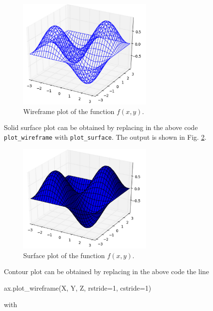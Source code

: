 \begin{figure}[!ht]
\begin{center}
\includegraphics[width=0.6\textwidth]{imgp/plot3d-2.png}
\end{center}
\vspace{-4mm}
\caption{Wireframe plot of the function $f(x, y)$.}
\label{fig:plot3d-2}
\end{figure}
\noindent
Solid surface plot can be obtained by replacing in the above code 
{\tt plot\_wireframe} with {\tt plot\_surface}. 
The output is shown in Fig. \ref{fig:plot3d-3}.

\begin{figure}[!ht]
\begin{center}
\includegraphics[width=0.6\textwidth]{imgp/plot3d-3.png}
\end{center}
\vspace{-4mm}
\caption{Surface plot of the function $f(x, y)$.}
\label{fig:plot3d-3}
\end{figure}
\newpage

\noindent
Contour plot can be obtained by replacing in the above code 
the line 

\begin{bluecode}
ax.plot_wireframe(X, Y, Z, rstride=1, cstride=1)
\end{bluecode}
with 

